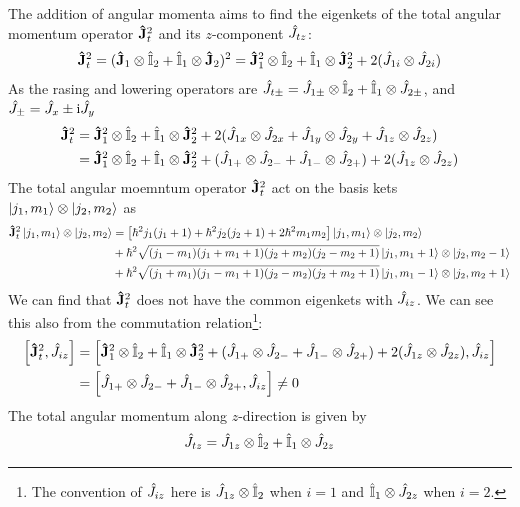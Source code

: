 The addition of angular momenta aims to find the eigenkets of the total angular momentum operator $\mathbf{\hat{J}}_t^2$ and its $z$-component $\hat{J}_{tz}$:
\begin{align}
    \mathbf{\hat{J}}_t^2 = (\mathbf{\hat{J}}_1 \otimes \hat{\mathbb{I}}_2 + \hat{\mathbb{I}}_1 \otimes \mathbf{\hat{J}}_2)^2 = \mathbf{\hat{J}}_1^2 \otimes \hat{\mathbb{I}}_2 + \hat{\mathbb{I}}_1 \otimes \mathbf{\hat{J}}_2^2 + 2 (\hat{J}_{1i} \otimes \hat{J}_{2i})
\end{align}
As the rasing and lowering operators are $\hat{J}_{t \pm} = \hat{J}_{1 \pm} \otimes \hat{\mathbb{I}}_2 + \hat{\mathbb{I}}_1 \otimes \hat{J}_{2 \pm}$, and $\hat{J}_{\pm} = \hat{J}_x \pm \mathrm{i} \hat{J}_y$ 
\begin{align*}
    \mathbf{\hat{J}}_t^2 & = \mathbf{\hat{J}}_1^2 \otimes \hat{\mathbb{I}}_2 + \hat{\mathbb{I}}_1 \otimes \mathbf{\hat{J}}_2^2 + 2 (\hat{J}_{1x} \otimes \hat{J}_{2x} + \hat{J}_{1y} \otimes \hat{J}_{2y} + \hat{J}_{1z} \otimes \hat{J}_{2z}) \\
    & = \mathbf{\hat{J}}_1^2 \otimes \hat{\mathbb{I}}_2 + \hat{\mathbb{I}}_1 \otimes \mathbf{\hat{J}}_2^2 + (\hat{J}_{1+} \otimes \hat{J}_{2-} + \hat{J}_{1-} \otimes \hat{J}_{2+}) + 2 (\hat{J}_{1z} \otimes \hat{J}_{2z})
\end{align*}
The total angular moemntum operator $\mathbf{\hat{J}}_t^2$ act on the basis kets $\ket{j_1,m_1} \otimes \ket{j_2,m_2}$ as
\begin{align*}
    \mathbf{\hat{J}}_t^2 \ket{j_1,m_1} \otimes \ket{j_2,m_2} & = \left[ \hbar^2 j_1 (j_1 + 1) + \hbar^2 j_2 (j_2 + 1) + 2 \hbar^2 m_1 m_2 \right] \ket{j_1,m_1} \otimes \ket{j_2,m_2} \\
    & + \hbar^2 \sqrt{(j_1 - m_1)(j_1 + m_1 + 1)(j_2 + m_2)(j_2 - m_2 + 1)} \ket{j_1,m_1 + 1} \otimes \ket{j_2,m_2 - 1} \\
    & + \hbar^2 \sqrt{(j_1 + m_1)(j_1 - m_1 + 1)(j_2 - m_2)(j_2 + m_2 + 1)} \ket{j_1,m_1 - 1} \otimes \ket{j_2,m_2 + 1}
\end{align*}
We can find that $\mathbf{\hat{J}}_t^2$ does not have the common eigenkets with $\hat{J}_{iz}$. We can see this also from the commutation relation\footnote{The convention of $\hat{J}_{iz}$ here is $\hat{J}_{1z} \otimes \hat{\mathbb{I}}_2$ when $i=1$ and $\hat{\mathbb{I}}_1 \otimes \hat{J}_{2z}$ when $i=2$.}: 
\begin{align*}
    \left[ \mathbf{\hat{J}}_t^2 , \hat{J}_{iz} \right] & = \left[ \mathbf{\hat{J}}_1^2 \otimes \hat{\mathbb{I}}_2 + \hat{\mathbb{I}}_1 \otimes \mathbf{\hat{J}}_2^2 + (\hat{J}_{1+} \otimes \hat{J}_{2-} + \hat{J}_{1-} \otimes \hat{J}_{2+}) + 2 (\hat{J}_{1z} \otimes \hat{J}_{2z}) , \hat{J}_{iz} \right] \\
    & = \left[ \hat{J}_{1+} \otimes \hat{J}_{2-} + \hat{J}_{1-} \otimes \hat{J}_{2+} , \hat{J}_{iz} \right] \ne 0
\end{align*}
The total angular momentum along $z$-direction is given by
\begin{align}
    \hat{J}_{tz} = \hat{J}_{1z} \otimes \hat{\mathbb{I}}_2 + \hat{\mathbb{I}}_1 \otimes \hat{J}_{2z}
\end{align}
